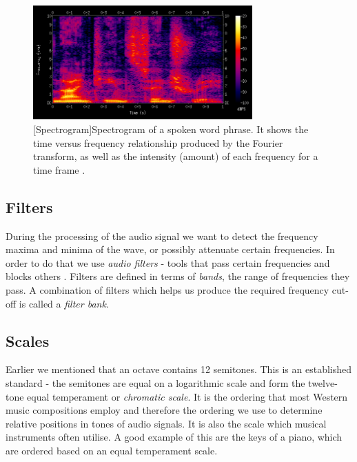 \begin{figure}[H]
    \centering
    \includegraphics[width=0.75\textwidth]{BackgroundTheory/spectrogram.png}
    [Spectrogram]{Spectrogram of a spoken word phrase. It shows the time versus frequency relationship produced by the Fourier transform, as well as the intensity (amount) of each frequency for a time frame \cite{wiki:spectrogram}.}
    \label{fig:spectrogram}
\end{figure}

\subsection{Filters}
\label{subsec:filters}
During the processing of the audio signal we want to detect the frequency maxima
and minima of the wave, or possibly attenuate certain frequencies. In order to
do that we use \textit{audio filters} - tools that pass certain frequencies and
blocks others \cite{filters}. Filters are defined in terms of \textit{bands},
the range of frequencies they pass. A combination of filters which helps us
produce the required frequency cut-off is called a \textit{filter bank}.

\subsection{Scales}
\label{subsec:scales}
Earlier we mentioned that an octave contains 12 semitones. This is an
established standard - the semitones are equal on a logarithmic scale and form
the twelve-tone equal temperament or \textit{chromatic scale}. It is the
ordering that most Western music compositions employ and therefore the ordering
we use to determine relative positions in tones of audio signals. It is also the
scale which musical instruments often utilise. A good example of this are the
keys of a piano, which are ordered based on an equal temperament scale.


